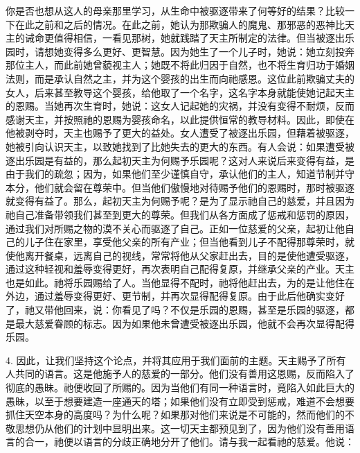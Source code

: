 你是否也想从这人的母亲那里学习，从生命中被驱逐带来了何等好的结果？比较一下在此之前和之后的情况。在此之前，她认为那欺骗人的魔鬼、那邪恶的恶神比天主的诫命更值得相信，一看见那树，她就践踏了天主所制定的法律。但当被逐出乐园时，请想她变得多么更好、更智慧。因为她生了一个儿子时，她说：她立刻投奔那位主人，而此前她曾藐视主人；她既不将此归因于自然，也不将生育归功于婚姻法则，而是承认自然之主，并为这个婴孩的出生而向祂感恩。这位此前欺骗丈夫的女人，后来甚至教导这个婴孩，给他取了一个名字，这名字本身就能使她记起天主的恩赐。当她再次生育时，她说：这女人记起她的灾祸，并没有变得不耐烦，反而感谢天主，并按照祂的恩赐为婴孩命名，以此提供恒常的教导材料。因此，即使在他被剥夺时，天主也赐予了更大的益处。女人遭受了被逐出乐园，但藉着被驱逐，她被引向认识天主，以致她找到了比她失去的更大的东西。有人会说：如果遭受被逐出乐园是有益的，那么起初天主为何赐予乐园呢？这对人来说后来变得有益，是由于我们的疏忽；因为，如果他们至少谨慎自守，承认他们的主人，知道节制并守本分，他们就会留在尊荣中。但当他们傲慢地对待赐予他们的恩赐时，那时被驱逐就变得有益了。那么，起初天主为何赐予呢？是为了显示祂自己的慈爱，并且因为祂自己准备带领我们甚至到更大的尊荣。但我们从各方面成了惩戒和惩罚的原因，通过我们对所赐之物的漠不关心而驱逐了自己。正如一位慈爱的父亲，起初让他自己的儿子住在家里，享受他父亲的所有产业；但当他看到儿子不配得那尊荣时，就使他离开餐桌，远离自己的视线，常常将他从父家赶出去，目的是使他遭受驱逐，通过这种轻视和羞辱变得更好，再次表明自己配得复原，并继承父亲的产业。天主也是如此。祂将乐园赐给了人。当他显得不配时，祂将他赶出去，为的是让他住在外边，通过羞辱变得更好、更节制，并再次显得配得复原。由于此后他确实变好了，祂又带他回来，说：你看见了吗？不仅是乐园的恩赐，甚至是乐园的驱逐，都是最大慈爱眷顾的标志。因为如果他未曾遭受被逐出乐园，他就不会再次显得配得乐园。\par

4. 因此，让我们坚持这个论点，并将其应用于我们面前的主题。天主赐予了所有人共同的语言。这是他施予人的慈爱的一部分。他们没有善用这恩赐，反而陷入了彻底的愚昧。祂便收回了所赐的。因为当他们有同一种语言时，竟陷入如此巨大的愚昧，以至于想要建造一座通天的塔；如果他们没有立即受到惩戒，难道不会想要抓住天空本身的高度吗？为什么呢？如果那对他们来说是不可能的，然而他们的不敬思想仍从他们的计划中显明出来。这一切天主都预见到了，因为他们没有善用语言的合一，祂便以语言的分歧正确地分开了他们。请与我一起看祂的慈爱。他说：\par

